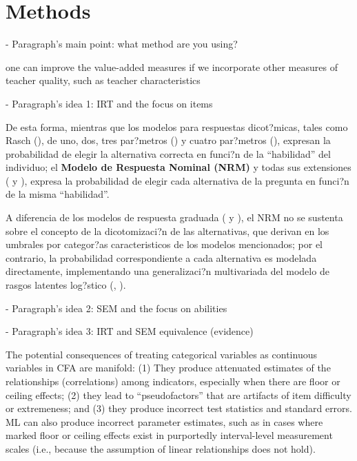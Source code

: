 \section{Methods}

- Paragraph's main point: what method are you using?

one can improve the value-added measures if we incorporate other measures of teacher quality, such as teacher characteristics \citep{Chetty_et_al_2014a}

- Paragraph's idea 1: IRT and the focus on items

De esta forma, mientras que los modelos para respuestas dicot?micas, tales como Rasch (\citealp{Rasch1980}), de uno, dos, tres par?metros (\citealp{Lord_Nov2008}) y cuatro par?metros (\citealp{McDonald1967}), expresan la probabilidad de elegir la alternativa correcta en funci?n de la ``habilidad'' del individuo; el \textbf{Modelo de Respuesta Nominal (NRM)} y todas sus extensiones (\citealt{Bock1972}  y \citealt[cap?tulo 2]{Linden1997}), expresa la probabilidad de elegir cada alternativa de la pregunta en funci?n de la misma ``habilidad''.

A diferencia de los modelos de respuesta graduada (\citealt{Samejima1969, Samejima1972} y \citealt[cap?tulo 5]{Ham_Swam1991}), el NRM no se sustenta sobre el concepto de la dicotomizaci?n de las alternativas, que derivan en los umbrales por categor?as caracteristicos de los modelos mencionados; por el contrario, la probabilidad correspondiente a cada alternativa es modelada directamente, implementando una generalizaci?n multivariada del modelo de rasgos latentes log?stico (\citealt{Bock1972}, \citealt{Ostini2006}).



- Paragraph's idea 2: SEM and the focus on abilities




- Paragraph's idea 3: IRT and SEM equivalence (evidence)

\citep{Brown_2015}
The potential consequences of treating categorical variables as continuous variables in CFA are manifold: (1) They produce attenuated estimates of the relationships (correlations) among indicators, especially when there are floor or ceiling effects; (2) they lead to “pseudofactors” that are artifacts of item difficulty or extremeness; and (3) they produce incorrect test statistics and standard errors. ML can also produce  incorrect parameter estimates, such as in cases where marked floor or ceiling effects exist in purportedly interval-level measurement scales (i.e., because the assumption of linear relationships does not hold).


